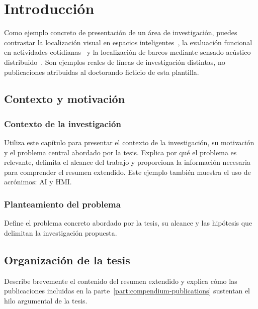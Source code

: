 %

\chapter{Introducción}
\label{cha:compendium-introduction}

Como ejemplo concreto de presentación de un área de investigación, puedes contrastar la localización visual en espacios inteligentes~\cite{Sanabria2026Landmark}, la evaluación funcional en actividades cotidianas~\cite{nieva2024proposal} y la localización de barcos mediante sensado acústico distribuido~\cite{ramirez2026jstars}. Son ejemplos reales de líneas de investigación distintas, no publicaciones atribuidas al doctorando ficticio de esta plantilla.

\section{Contexto y motivación}
\subsection{Contexto de la investigación}

Utiliza este capítulo para presentar el contexto de la investigación, su motivación y el problema central abordado por la tesis. Explica por qué el problema es relevante, delimita el alcance del trabajo y proporciona la información necesaria para comprender el resumen extendido. Este ejemplo también muestra el uso de acrónimos: \gls{AI} y \gls{HMI}.

\subsection{Planteamiento del problema}

Define el problema concreto abordado por la tesis, su alcance y las hipótesis que delimitan la investigación propuesta.

\section{Organización de la tesis}

Describe brevemente el contenido del resumen extendido y explica cómo las publicaciones incluidas en la parte~\ref{part:compendium-publications} sustentan el hilo argumental de la tesis.

